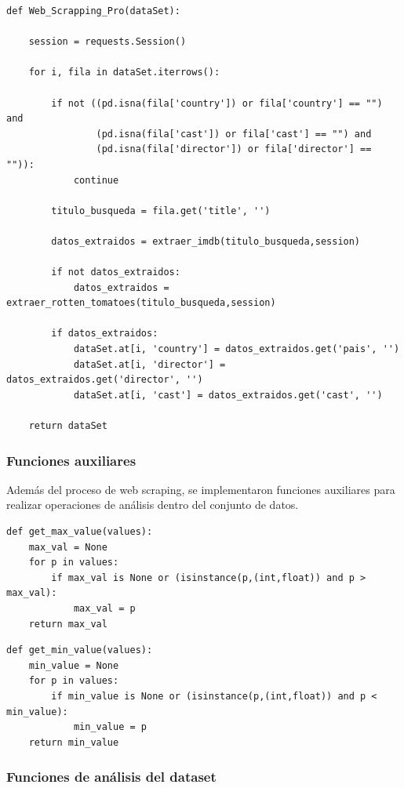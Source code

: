 \documentclass[12pt]{article}
\begin{document}
\begin{lstlisting}
def Web_Scrapping_Pro(dataSet):

    session = requests.Session()

    for i, fila in dataSet.iterrows():

        if not ((pd.isna(fila['country']) or fila['country'] == "") and 
                (pd.isna(fila['cast']) or fila['cast'] == "") and 
                (pd.isna(fila['director']) or fila['director'] == "")):
            continue

        titulo_busqueda = fila.get('title', '')

        datos_extraidos = extraer_imdb(titulo_busqueda,session)

        if not datos_extraidos:
            datos_extraidos = extraer_rotten_tomatoes(titulo_busqueda,session)

        if datos_extraidos:
            dataSet.at[i, 'country'] = datos_extraidos.get('pais', '')
            dataSet.at[i, 'director'] = datos_extraidos.get('director', '')
            dataSet.at[i, 'cast'] = datos_extraidos.get('cast', '')

    return dataSet
\end{lstlisting}

\subsubsection{Funciones auxiliares}

Además del proceso de web scraping, se implementaron funciones auxiliares
para realizar operaciones de análisis dentro del conjunto de datos.

\begin{lstlisting}
def get_max_value(values):
    max_val = None
    for p in values:
        if max_val is None or (isinstance(p,(int,float)) and p > max_val):
            max_val = p
    return max_val
\end{lstlisting}

\begin{lstlisting}
def get_min_value(values): 
    min_value = None
    for p in values:
        if min_value is None or (isinstance(p,(int,float)) and p < min_value):
            min_value = p
    return min_value
\end{lstlisting}
\vspace{1cm}
\subsubsection{Funciones de análisis del dataset}
\end{document}
